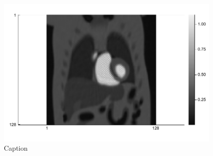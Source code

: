 \begin{figure}
    \centering
    \includegraphics[width=0.46\linewidth]{images/PINCAT_POGM_recon.pdf}
    \caption{Caption}
    \label{fig:PINCAT_POGM_recon}
\end{figure}

\clearpage %
